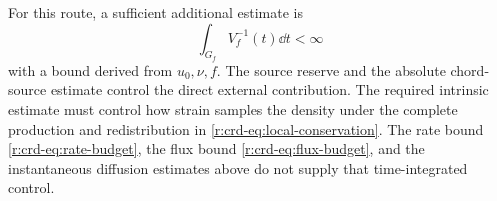 For this route, a sufficient additional estimate is
\[
 \int_{G_f}V_f^{-1}(t)\dd t<\infty
\]
with a bound derived from \(u_0,\nu,f\). The source reserve and the absolute
chord-source estimate control the direct external contribution.
The required intrinsic estimate must control how strain samples the density
under the complete production and redistribution in
\eqref{r:crd-eq:local-conservation}. The rate bound
\eqref{r:crd-eq:rate-budget}, the flux bound \eqref{r:crd-eq:flux-budget},
and the instantaneous diffusion estimates above do not supply that
time-integrated control.
